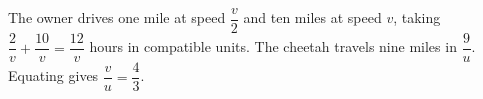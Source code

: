 The owner drives one mile at speed $\dfrac{v}{2}$ and ten miles at speed $v$, taking $\dfrac{2}{v}+\dfrac{10}{v}=\dfrac{12}{v}$ hours in compatible units. The cheetah travels nine miles in $\dfrac{9}{u}$. Equating gives $\dfrac{v}{u}=\boxed{\dfrac{4}{3}}$.
